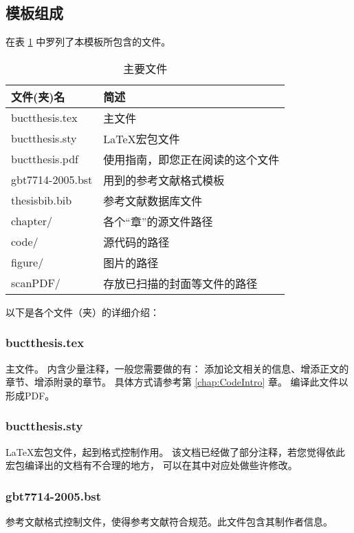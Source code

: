 \subsection{模板组成}
在表 \ref{tab:mainfile} 中罗列了本模板所包含的文件。
\begin{table}%
	\centering
	\caption{主要文件}
	\label{tab:mainfile}
	\begin{tabular}{ll}
		\toprule
		文件(夹)名                & 简述                             \\
		\midrule
		\textsf{buctthesis.tex}   & 主文件                           \\
		\textsf{buctthesis.sty}   & \LaTeX{}宏包文件                 \\
		\textsf{buctthesis.pdf}   & 使用指南，即您正在阅读的这个文件 \\
		\textsf{gbt7714-2005.bst} & \BibTeX{}用到的参考文献格式模板  \\
		\textsf{thesisbib.bib}    & \BibTeX{}参考文献数据库文件      \\
		\textsf{chapter/}         & 各个“章”的源文件路径             \\
		\textsf{code/}            & 源代码的路径                     \\
		\textsf{figure/}          & 图片的路径                       \\
		\textsf{scanPDF/}         & 存放已扫描的封面等文件的路径     \\
		\bottomrule
	\end{tabular}
\end{table}
以下是各个文件（夹）的详细介绍：
\subsubsection{\textsf{buctthesis.tex}}主文件。
内含少量注释，一般您需要做的有：
添加论文相关的信息、增添正文的章节、增添附录的章节。
具体方式请参考第 \ref{chap:CodeIntro} 章。
编译此文件以形成PDF。
\subsubsection{\textsf{buctthesis.sty}}
\LaTeX{}宏包文件，起到格式控制作用。
该文档已经做了部分注释，若您觉得依此宏包编译出的文档有不合理的地方，
可以在其中对应处做些许修改。
\subsubsection{\textsf{gbt7714-2005.bst}}
参考文献格式控制文件，使得参考文献符合规范。此文件包含其制作者信息。
